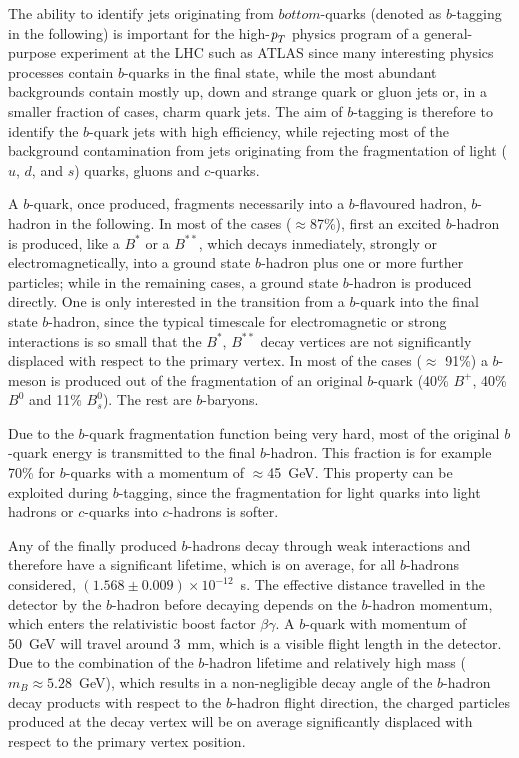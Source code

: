 The ability to identify jets originating from $bottom$-quarks (denoted as $b$-tagging in the following) is important for the high-${\emph{p}_{T}}$ physics program of a general-purpose experiment at the LHC such as ATLAS since many interesting physics processes contain $b$-quarks in the final state, while the most abundant backgrounds contain mostly up, down and strange quark or gluon jets or, in a smaller fraction of cases, charm quark jets. The aim of $b$-tagging is therefore to identify the $b$-quark jets with high efficiency, while rejecting most of the background contamination from jets originating from the fragmentation of light ($u$, $d$, and $s$) quarks, gluons and $c$-quarks.

A $b$-quark, once produced, fragments necessarily into a $b$-flavoured hadron, $b$-hadron in the following. In most of the cases ($\approx$87\%), first an excited $b$-hadron is produced, like a $B^{*}$ or a $B^{**}$, which decays inmediately, strongly or electromagnetically, into a ground state $b$-hadron plus one or more further particles; while in the remaining cases, a ground state $b$-hadron is produced directly.  One is only interested in the transition from a $b$-quark into the final state $b$-hadron, since the typical timescale for electromagnetic or strong interactions is so small that the  $B^{*}$, $B^{**}$ decay vertices are not significantly displaced with respect to the primary vertex.   In most of the cases ($\approx$ 91\%) a $b$-meson is produced out of the fragmentation of an original $b$-quark (40\% $B^+$, 40\% $B^0$ and 11\% $B^0_s$). The rest are $b$-baryons.

Due to the $b$-quark fragmentation function being very hard, most of the original $b$-quark energy is transmitted to the final $b$-hadron. This fraction is for example 70\% for $b$-quarks with a momentum of $\approx$45~GeV. This property can be exploited during $b$-tagging, since the fragmentation for light quarks into light hadrons or $c$-quarks into $c$-hadrons is softer.

Any of the finally produced $b$-hadrons decay through weak interactions and therefore have a significant lifetime, which is on average, for all $b$-hadrons considered, $(1.568\pm0.009) \times 10^{-12}$~s.  The effective distance travelled in the detector by the $b$-hadron before decaying depends on the $b$-hadron momentum, which enters the relativistic boost factor $\beta\gamma$. A $b$-quark with momentum of 50~GeV will travel around 3~mm, which is a visible flight length in the detector. Due to the combination of the $b$-hadron lifetime and relatively high mass ($m_B \approx 5.28$~GeV), which results in a non-negligible decay angle of the $b$-hadron decay products %
with respect to the $b$-hadron flight direction, the charged particles produced at the decay vertex will be on average significantly displaced with respect to the primary vertex position.

